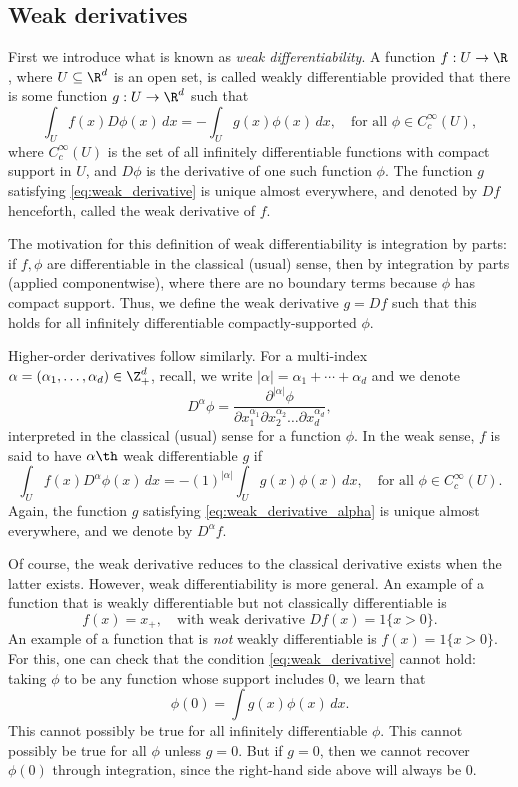 \documentclass{article}
\begin{document}
\subsection{Weak derivatives}

First we introduce what is known as \emph{weak differentiability}. A function $f
: U \to \R$, where $U \subseteq \R^d$ is an open set, is called weakly
differentiable provided that there is some function $g : U \to \R^d$ such that
\begin{equation}
\label{eq:weak_derivative}
\int_U f(x) D \phi(x) \, dx = - \int_U g(x) \phi(x) \, dx,
\quad \text{for all $\phi \in C_c^\infty(U)$}, 
\end{equation}
where $C_c^\infty(U)$ is the set of all infinitely differentiable functions with
compact support in $U$, and $D\phi$ is the derivative of one such function
$\phi$. The function $g$ satisfying \eqref{eq:weak_derivative} is unique almost
everywhere, and denoted by $Df$ henceforth, called the weak derivative of $f$.

The motivation for this definition of weak differentiability is integration by
parts: if $f,\phi$ are differentiable in the classical (usual) sense, then
 by
integration by parts (applied componentwise), where there are no boundary terms
because $\phi$ has compact support. Thus, we define the weak derivative $g = Df$
such that this holds for all infinitely differentiable compactly-supported
$\phi$.

Higher-order derivatives follow similarly. For a multi-index $\alpha =
(\alpha_1,\dots,\alpha_d) \in \Z^d_+$, recall, we write $|\alpha| = \alpha_1 +
\cdots + \alpha_d$ and we denote   
\[
D^\alpha \phi = \frac{\partial^{|\alpha|} \phi}{\partial x_1^{\alpha_1} \partial 
  x_2^{\alpha_2} \dots \partial x_d^{\alpha_d}},
\]
interpreted in the classical (usual) sense for a function $\phi$. In the weak
sense, $f$ is said to have $\alpha\th$ weak differentiable $g$ if 
\begin{equation}
\label{eq:weak_derivative_alpha}
\int_U f(x) D^\alpha \phi(x) \, dx = - (1)^{|\alpha|} \int_U g(x) \phi(x) \, dx,
\quad \text{for all $\phi \in C_c^\infty(U)$}.   
\end{equation}
Again, the function $g$ satisfying \eqref{eq:weak_derivative_alpha} is unique
almost everywhere, and we denote by $D^\alpha f$.

Of course, the weak derivative reduces to the classical derivative exists when
the latter exists. However, weak differentiability is more general. An example
of a function that is weakly differentiable but not classically differentiable
is
\[
f(x) = x_+, \quad \text{with weak derivative $Df(x) = 1\{x > 0\}$.} 
\]
An example of a function that is \emph{not} weakly differentiable is $f(x) =
1\{x > 0\}$. For this, one can check that the condition
\eqref{eq:weak_derivative} cannot hold: taking $\phi$ to be any function whose
support includes 0, we learn that
\[
\phi(0) = \int g(x) \phi(x) \, dx.
\]
This cannot possibly be true for all infinitely differentiable $\phi$. This
cannot possibly be true for all $\phi$ unless $g=0$. But if $g=0$, then we
cannot recover $\phi(0)$ through integration, since the right-hand side above
will always be 0.   
\end{document}
